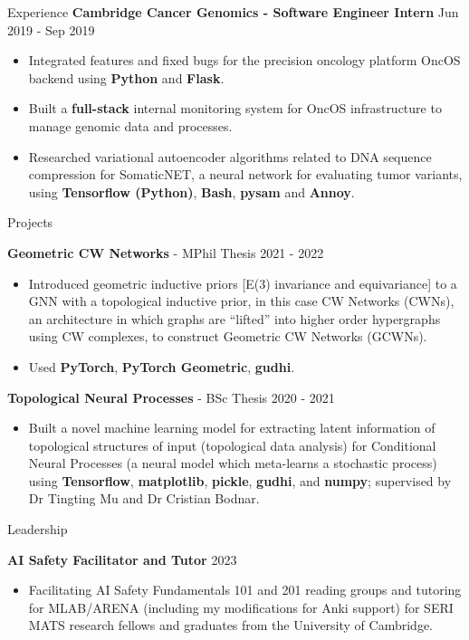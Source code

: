 \documentclass[hidelinks]{resume} %
\begin{document}
\begin{rSection}{Experience}
\textbf{Cambridge Cancer Genomics - Software Engineer Intern}
\hfill {Jun 2019 - Sep 2019}
\begin{itemize}
    \item Integrated features and fixed bugs for the precision oncology platform OncOS backend using \textbf{Python} and \textbf{Flask}.
    \item Built a \textbf{full-stack} internal monitoring system for OncOS infrastructure to manage genomic data and processes.
    \item Researched variational autoencoder algorithms related to DNA sequence compression for SomaticNET, a neural network for evaluating tumor variants, using \textbf{Tensorflow (Python)}, \textbf{Bash}, \textbf{pysam} and \textbf{Annoy}.
\end{itemize}

\end{rSection} 
\begin{rSection}{Projects}

\textbf{Geometric CW Networks} - MPhil Thesis
\hfill{2021 - 2022}
\begin{itemize}
    \item Introduced geometric inductive priors [E(3) invariance and equivariance] to a GNN with a topological inductive prior, in this case CW Networks (CWNs), an architecture in which graphs are ``lifted'' into higher order hypergraphs using CW complexes, to construct Geometric CW Networks (GCWNs).
    \item Used \textbf{PyTorch}, \textbf{PyTorch Geometric}, \textbf{gudhi}.
\end{itemize}

\textbf{Topological Neural Processes} - BSc Thesis
\hfill{2020 - 2021}
\begin{itemize}
    \item Built a novel machine learning model for extracting latent information of topological structures of input (topological data analysis) for Conditional Neural Processes (a neural model which meta-learns a stochastic process) using \textbf{Tensorflow}, \textbf{matplotlib}, \textbf{pickle}, \textbf{gudhi}, and \textbf{numpy}; supervised by Dr Tingting Mu and Dr Cristian Bodnar.
\end{itemize}

\end{rSection}
\begin{rSection}{Leadership}

\textbf{AI Safety Facilitator and Tutor}
\hfill{2023}
\begin{itemize}
    \item Facilitating AI Safety Fundamentals 101 and 201 reading groups and tutoring for MLAB/ARENA (including my modifications for Anki support) for SERI MATS research fellows and graduates from the University of Cambridge.
\end{itemize}

\end{rSection}
\end{document}
